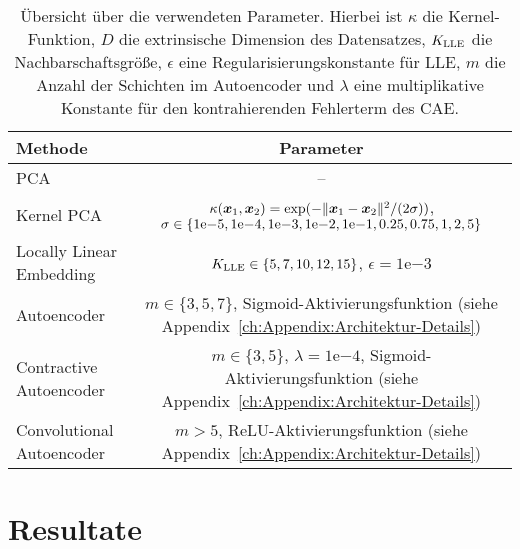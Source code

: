\begin{table}[ht]
	\tymax=300pt
	\centering
	\begin{tabulary}{\textwidth}{LC}
		\toprule
		Methode                            & Parameter                                                            \\ \midrule
		PCA      & --                                                                   \\
		Kernel PCA                         & $\kappa(\bm{x}_1, \bm{x}_2) = \exp(- \lVert\bm{x}_1 - \bm{x}_2\rVert^2/(2\sigma))$, $\sigma \in \{1 \mathrm{e}{-5},1 \mathrm{e}{-4}, 1 \mathrm{e}{-3}, 1 \mathrm{e}{-2}, 1 \mathrm{e}{-1}, 0.25, 0.75, 1, 2, 5\}$ \\
		Locally Linear Embedding     & $K_{\text{LLE}} \in \{ 5, 7, 10, 12, 15\}$, $\epsilon=1\mathrm{e}{-3}$                                   \\
		Autoencoder                  & $m \in \{3, 5, 7\}$, Sigmoid-Aktivierungsfunktion \newline (siehe
		Appendix~\ref{ch:Appendix:Architektur-Details})                                                           \\  Contractive Autoencoder & $m \in \{3, 5\}$, $\lambda=1\mathrm{e}{-4}$,
		Sigmoid-Aktivierungsfunktion (siehe Appendix~\ref{ch:Appendix:Architektur-Details})                       \\
		Convolutional Autoencoder & $m > 5$, ReLU-Aktivierungsfunktion \newline (siehe
		Appendix~\ref{ch:Appendix:Architektur-Details})                                                           \\ \bottomrule
	\end{tabulary}
	\caption[Übersicht über die verwendeten Parameter der Methoden]{Übersicht über die verwendeten Parameter. Hierbei ist $\kappa$ die Kernel-Funktion, $D$ die extrinsische Dimension des Datensatzes, $K_{\text{LLE}}$ die Nachbarschaftsgröße, $\epsilon$ eine Regularisierungskonstante für LLE, $m$ die Anzahl der Schichten im Autoencoder und $\lambda$ eine multiplikative Konstante für den kontrahierenden Fehlerterm des CAE.}
	\label{tab:uebersicht-parameter}
\end{table}
\section{Resultate}
\label{ch:Vergleich:sec:Resultate}

